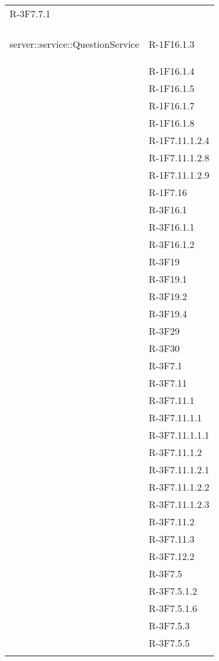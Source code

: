 \begin{longtable}{l p{3cm}}
	R-3F7.7.1 \tabularnewline &\tabularnewline
	\hline
	\hypertarget{server::service::QuestionService}{server::service::QuestionService} & R-1F16.1.3 \tabularnewline &
	
	R-1F16.1.4 \tabularnewline &
	
	R-1F16.1.5 \tabularnewline &
	
	R-1F16.1.7 \tabularnewline &
	
	R-1F16.1.8 \tabularnewline &
	
	R-1F7.11.1.2.4 \tabularnewline &
	
	R-1F7.11.1.2.8 \tabularnewline &
	
	R-1F7.11.1.2.9 \tabularnewline &
	
	R-1F7.16 \tabularnewline &
	
	R-3F16.1 \tabularnewline &
	
	R-3F16.1.1 \tabularnewline &
	
	R-3F16.1.2 \tabularnewline &
	
	R-3F19 \tabularnewline &
	
	R-3F19.1 \tabularnewline &
	
	R-3F19.2 \tabularnewline &
	
	R-3F19.4 \tabularnewline &
	
	R-3F29 \tabularnewline &
	
	R-3F30 \tabularnewline &
	
	R-3F7.1 \tabularnewline &
	
	R-3F7.11 \tabularnewline &
	
	R-3F7.11.1 \tabularnewline &
	
	R-3F7.11.1.1 \tabularnewline &
	
	R-3F7.11.1.1.1 \tabularnewline &
	
	R-3F7.11.1.2 \tabularnewline &
	
	R-3F7.11.1.2.1 \tabularnewline &
	
	R-3F7.11.1.2.2 \tabularnewline &
	
	R-3F7.11.1.2.3 \tabularnewline &
	
	R-3F7.11.2 \tabularnewline &
	
	R-3F7.11.3 \tabularnewline &
	
	R-3F7.12.2 \tabularnewline &
	
	R-3F7.5 \tabularnewline &
	
	R-3F7.5.1.2 \tabularnewline &
	
	R-3F7.5.1.6 \tabularnewline &
	
	R-3F7.5.3 \tabularnewline &
	
	R-3F7.5.5 \tabularnewline &
	

\end{longtable}
